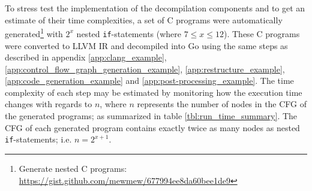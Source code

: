 To stress test the implementation of the decompilation components and to get an estimate of their time complexities, a set of C programs were automatically generated\footnote{Generate nested C programs: \url{https://gist.github.com/mewmew/677994ee8da60bee1de9}} with $ 2^{x} $ nested \texttt{if}-statements (where $ 7 \le x \le 12 $). These C programs were converted to LLVM IR and decompiled into Go using the same steps as described in appendix \ref{app:clang_example}, \ref{app:control_flow_graph_generation_example}, \ref{app:restructure_example}, \ref{app:code_generation_example} and \ref{app:post-processing_example}. The time complexity of each step may be estimated by monitoring how the execution time changes with regards to $ n $, where $ n $ represents the number of nodes in the CFG of the generated programs; as summarized in table \ref{tbl:run_time_summary}. The CFG of each generated program contains exactly twice as many nodes as nested \texttt{if}-statements; i.e. $ n = 2^{x+1} $.

